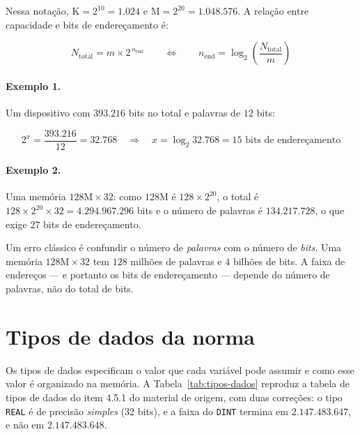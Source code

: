 Nessa notação, $\text{K} = 2^{10} = 1.024$ e $\text{M} = 2^{20} = 1.048.576$. A relação entre
capacidade e bits de endereçamento é:

\begin{equation}
  N_{\text{total}} = m \times 2^{\,n_{\text{end}}}
  \qquad\Longleftrightarrow\qquad
  n_{\text{end}} = \log_2\!\left(\frac{N_{\text{total}}}{m}\right)
  \label{eq:calculo-memoria}
\end{equation}

\paragraph{Exemplo 1.} Um dispositivo com $393.216$ bits no total e palavras de $12$ bits:

$$
2^{x} = \frac{393.216}{12} = 32.768 \quad\Longrightarrow\quad
x = \log_2 32.768 = 15 \text{ bits de endereçamento}
$$

\paragraph{Exemplo 2.} Uma memória $128\text{M} \times 32$: como $128\text{M}$ é
$128 \times 2^{20}$, o total é $128 \times 2^{20} \times 32 = 4.294.967.296$ bits e o número de
palavras é $134.217.728$, o que exige $27$ bits de endereçamento.

\begin{atencao}
Um erro clássico é confundir o número de \emph{palavras} com o número de \emph{bits}. Uma memória
$128\text{M}\times32$ tem $128$ milhões de palavras e $4$ bilhões de bits. A faixa de endereços
--- e portanto os bits de endereçamento --- depende do número de palavras, não do total de bits.
\end{atencao}

\section{Tipos de dados da norma}

Os tipos de dados especificam o valor que cada variável pode assumir e como esse valor é organizado
na memória. A Tabela~\ref{tab:tipos-dados} reproduz a tabela de tipos de dados do item 4.5.1 do
material de origem, com duas correções: o tipo \texttt{REAL} é de precisão \emph{simples} (32 bits),
e a faixa do \texttt{DINT} termina em $2.147.483.647$, e não em $2.147.483.648$.

